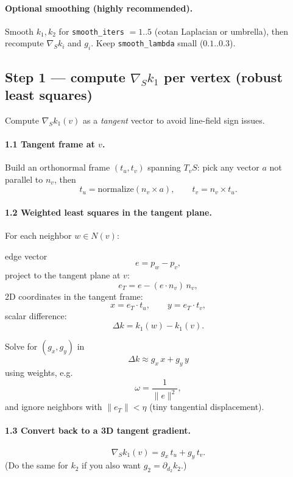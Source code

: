 \documentclass[12pt,a4paper]{article}
\theoremstyle{plain}
\theoremstyle{definition}      %
\begin{document}
	\paragraph{Optional smoothing (highly recommended).}
	Smooth $k_1,k_2$ for \texttt{smooth\_iters} $=1..5$ (cotan Laplacian or umbrella),
	then recompute $\nabla_S k_i$ and $g_i$.
	Keep \texttt{smooth\_lambda} small ($0.1..0.3$).
	
	
	\subsection*{Step 1 — compute $\nabla_S k_1$ per vertex (robust least squares)}
	
	Compute $\nabla_S k_1(v)$ as a \emph{tangent} vector to avoid line-field sign issues.
	
	\paragraph{1.1 Tangent frame at $v$.}
	Build an orthonormal frame $(t_u,t_v)$ spanning $T_vS$:
	pick any vector $a$ not parallel to $n_v$, then
	\[
	t_u=\mathrm{normalize}(n_v\times a),
	\qquad
	t_v=n_v\times t_u.
	\]
	
	\paragraph{1.2 Weighted least squares in the tangent plane.}
	For each neighbor $w\in N(v)$:
	
	edge vector
	\[
	e=p_w-p_v,
	\]
	project to the tangent plane at $v$:
	\[
	e_T=e-(e\cdot n_v)\,n_v,
	\]
	2D coordinates in the tangent frame:
	\[
	x=e_T\cdot t_u,\qquad y=e_T\cdot t_v,
	\]
	scalar difference:
	\[
	\Delta k = k_1(w)-k_1(v).
	\]
	
	Solve for $(g_x,g_y)$ in
	\[
	\Delta k \approx g_x\,x + g_y\,y
	\]
	using weights, e.g.
	\[
	\omega=\frac{1}{\|e\|^2},
	\]
	and ignore neighbors with $\|e_T\|<\eta$ (tiny tangential displacement).
	
	\paragraph{1.3 Convert back to a 3D tangent gradient.}
	\[
	\nabla_S k_1(v) = g_x\,t_u + g_y\,t_v.
	\]
	(Do the same for $k_2$ if you also want $g_2=\partial_{d_2}k_2$.)
	
\end{document}
